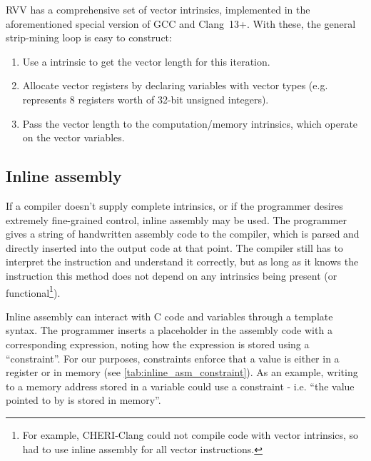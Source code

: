 RVV has a comprehensive set of vector intrinsics, implemented in the aforementioned special version of GCC and Clang~13+.
With these, the general strip-mining loop is easy to construct:
\begin{enumerate}
    \item Use a  intrinsic to get the vector length for this iteration.
    \item Allocate vector registers by declaring variables with vector types (e.g.  represents 8 registers worth of 32-bit unsigned integers).
    \item Pass the vector length to the computation/memory intrinsics, which operate on the vector variables.
\end{enumerate}


\subsection{Inline assembly}
If a compiler doesn't supply complete intrinsics, or if the programmer desires extremely fine-grained control, inline assembly may be used.
The programmer gives a string of handwritten assembly code to the compiler, which is parsed and directly inserted into the output code at that point.
The compiler still has to interpret the instruction and understand it correctly, but as long as it knows the instruction this method does not depend on any intrinsics being present (or functional\footnote{For example, CHERI-Clang could not compile code with vector intrinsics, so had to use inline assembly for all vector instructions.}).

Inline assembly can interact with C code and variables through a template syntax.
The programmer inserts a placeholder in the assembly code with a corresponding expression, noting how the expression is stored using a \enquote{constraint}.
For our purposes, constraints enforce that a value is either in a register or in memory (see \cref{tab:inline_asm_constraint}).
As an example, writing to a memory address stored in a variable could use a constraint  - i.e. \enquote{the value pointed to by  is stored in memory}.  

